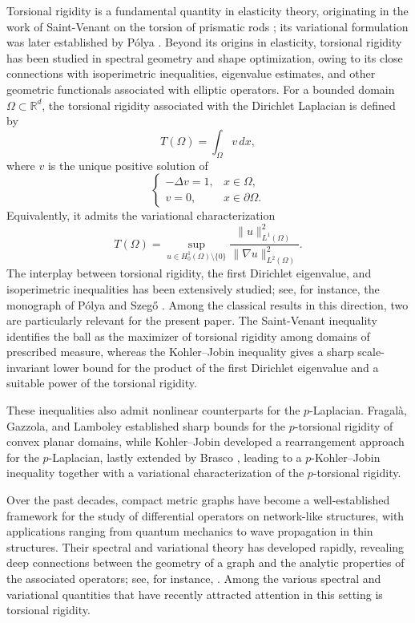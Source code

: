 \documentclass[12pt,a4paper]{article}
\numberwithin{equation}{section}
\begin{document}
Torsional rigidity is a fundamental quantity in elasticity theory,
originating in the work of Saint-Venant on the torsion of prismatic rods
\cite{SV}; its variational formulation was later established by P\'olya
\cite{Polya, pol3}. Beyond its origins in elasticity, torsional rigidity has been studied in spectral geometry and shape optimization, owing to its close connections with isoperimetric inequalities, eigenvalue estimates, and other geometric functionals associated with elliptic operators. For a bounded domain $\Omega\subset\mathbb{R}^d$, the
torsional rigidity associated with the Dirichlet Laplacian is defined by
\[
T(\Omega)=\int_\Omega v\,dx,
\]
where $v$ is the unique positive solution of
\[
\begin{cases}
	-\Delta v =1, & x\in\Omega,\\
	v=0, & x\in\partial\Omega.
\end{cases}
\]
Equivalently, it admits the variational characterization
\[
T(\Omega)
=
\sup_{u\in H_0^1(\Omega)\setminus\{0\}}
\frac{\|u\|_{L^1(\Omega)}^2}
{\|\nabla u\|_{L^2(\Omega)}^2}.
\]
The interplay between torsional rigidity, the first Dirichlet eigenvalue,
and isoperimetric inequalities has been extensively studied; see, for
instance, the monograph of P\'olya and Szeg\H{o} \cite{PS}. Among the
classical results in this direction, two are particularly relevant for the
present paper. The Saint-Venant inequality identifies the ball as the
maximizer of torsional rigidity among domains of prescribed measure,
whereas the Kohler--Jobin inequality \cite{KJ} gives a sharp
scale-invariant lower bound for the product of the first Dirichlet
eigenvalue and a suitable power of the torsional rigidity.

These inequalities also admit nonlinear counterparts for the
$p$-Laplacian. Fragal\`a, Gazzola, and Lamboley \cite{FGL13} established
sharp bounds for the $p$-torsional rigidity of convex planar domains,
while Kohler--Jobin  developed a rearrangement approach for the
$p$-Laplacian, lastly extended by Brasco \cite{Brasco}, leading to a $p$-Kohler--Jobin inequality together with a
variational characterization of the $p$-torsional rigidity.

Over the past decades, compact metric graphs have become a well-established framework for the study of differential operators on network-like structures, with applications ranging from quantum mechanics to wave propagation in thin structures. Their spectral and variational theory has developed rapidly, revealing deep connections between the geometry of a graph and the analytic properties of the associated operators; see, for instance, \cite{BK,kuch1, kuch2}.
Among the various spectral and variational quantities that have recently attracted attention in this setting is torsional rigidity.
\end{document}
